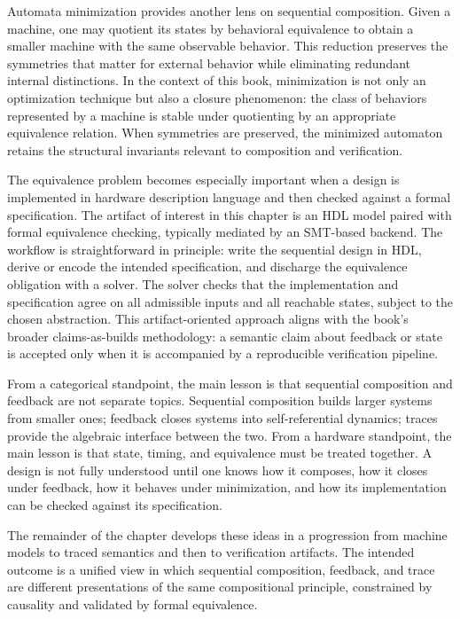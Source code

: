 \documentclass[11pt]{article}
\begin{document}
Automata minimization provides another lens on sequential composition. Given a machine, one may quotient its states by behavioral equivalence to obtain a smaller machine with the same observable behavior. This reduction preserves the symmetries that matter for external behavior while eliminating redundant internal distinctions. In the context of this book, minimization is not only an optimization technique but also a closure phenomenon: the class of behaviors represented by a machine is stable under quotienting by an appropriate equivalence relation. When symmetries are preserved, the minimized automaton retains the structural invariants relevant to composition and verification.

The equivalence problem becomes especially important when a design is implemented in hardware description language and then checked against a formal specification. The artifact of interest in this chapter is an HDL model paired with formal equivalence checking, typically mediated by an SMT-based backend. The workflow is straightforward in principle: write the sequential design in HDL, derive or encode the intended specification, and discharge the equivalence obligation with a solver. The solver checks that the implementation and specification agree on all admissible inputs and all reachable states, subject to the chosen abstraction. This artifact-oriented approach aligns with the book's broader claims-as-builds methodology: a semantic claim about feedback or state is accepted only when it is accompanied by a reproducible verification pipeline.

From a categorical standpoint, the main lesson is that sequential composition and feedback are not separate topics. Sequential composition builds larger systems from smaller ones; feedback closes systems into self-referential dynamics; traces provide the algebraic interface between the two. From a hardware standpoint, the main lesson is that state, timing, and equivalence must be treated together. A design is not fully understood until one knows how it composes, how it closes under feedback, how it behaves under minimization, and how its implementation can be checked against its specification.

The remainder of the chapter develops these ideas in a progression from machine models to traced semantics and then to verification artifacts. The intended outcome is a unified view in which sequential composition, feedback, and trace are different presentations of the same compositional principle, constrained by causality and validated by formal equivalence.
\end{document}
